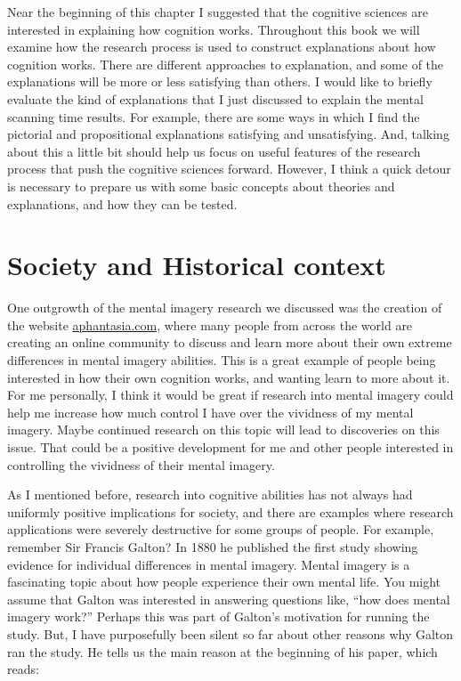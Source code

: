 \documentclass[
  oneside,
  12pt]{crumpbook}
\begin{document}
Near the beginning of this chapter I suggested that the cognitive sciences are interested in explaining how cognition works. Throughout this book we will examine how the research process is used to construct explanations about how cognition works. There are different approaches to explanation, and some of the explanations will be more or less satisfying than others. I would like to briefly evaluate the kind of explanations that I just discussed to explain the mental scanning time results. For example, there are some ways in which I find the pictorial and propositional explanations satisfying and unsatisfying. And, talking about this a little bit should help us focus on useful features of the research process that push the cognitive sciences forward. However, I think a quick detour is necessary to prepare us with some basic concepts about theories and explanations, and how they can be tested.

\hypertarget{society-and-historical-context-1}{%
\section{Society and Historical context}\label{society-and-historical-context-1}}

One outgrowth of the mental imagery research we discussed was the creation of the website \url{aphantasia.com}, where many people from across the world are creating an online community to discuss and learn more about their own extreme differences in mental imagery abilities. This is a great example of people being interested in how their own cognition works, and wanting learn to more about it. For me personally, I think it would be great if research into mental imagery could help me increase how much control I have over the vividness of my mental imagery. Maybe continued research on this topic will lead to discoveries on this issue. That could be a positive development for me and other people interested in controlling the vividness of their mental imagery.

As I mentioned before, research into cognitive abilities has not always had uniformly positive implications for society, and there are examples where research applications were severely destructive for some groups of people. For example, remember Sir Francis Galton? In 1880 he published the first study showing evidence for individual differences in mental imagery. Mental imagery is a fascinating topic about how people experience their own mental life. You might assume that Galton was interested in answering questions like, ``how does mental imagery work?'' Perhaps this was part of Galton's motivation for running the study. But, I have purposefully been silent so far about other reasons why Galton ran the study. He tells us the main reason at the beginning of his paper, which reads:
\end{document}
